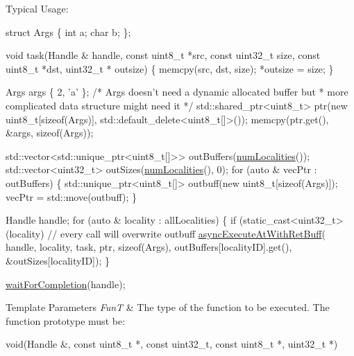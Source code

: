 Typical Usage\-: 
\begin{DoxyCode}
\textcolor{keyword}{struct }Args \{
  \textcolor{keywordtype}{int} a;
  \textcolor{keywordtype}{char} b;
\};

\textcolor{keywordtype}{void} task(Handle & handle, \textcolor{keyword}{const} uint8\_t *src, \textcolor{keyword}{const} uint32\_t size,
          \textcolor{keyword}{const} uint8\_t *dst, uint32\_t * outsize) \{
  memcpy(src, dst, size);
  *outsize = size;
\}

Args args \{ 2, \textcolor{charliteral}{'a'} \};
\textcolor{comment}{/* Args doesn't need a dynamic allocated buffer but}
\textcolor{comment}{ * more complicated data structure might need it */}
std::shared\_ptr<uint8\_t> ptr(\textcolor{keyword}{new} uint8\_t[\textcolor{keyword}{sizeof}(Args)],
                             std::default\_delete<uint8\_t[]>());
memcpy(ptr.get(), &args, \textcolor{keyword}{sizeof}(Args));

std::vector<std::unique\_ptr<uint8\_t[]>> outBuffers(\hyperlink{namespaceshad_1_1rt_a199bb50c21e9012f615520413872aef6}{numLocalities}());
std::vector<uint32\_t> outSizes(\hyperlink{namespaceshad_1_1rt_a199bb50c21e9012f615520413872aef6}{numLocalities}(), 0);
\textcolor{keywordflow}{for} (\textcolor{keyword}{auto} & vecPtr : outBuffers) \{
  std::unique\_ptr<uint8\_t[]> outbuff(\textcolor{keyword}{new} uint8\_t[\textcolor{keyword}{sizeof}(Args)]);
  vecPtr = std::move(outbuff);
\}

Handle handle;
\textcolor{keywordflow}{for} (\textcolor{keyword}{auto} & locality : allLocalities) \{
  \textcolor{keywordflow}{if} (static\_cast<uint32\_t>(locality) %
    \textcolor{comment}{// every call will overwrite outbuff}
    \hyperlink{namespaceshad_1_1rt_a7021749e6a86c90e762645385e22ac5c}{asyncExecuteAtWithRetBuff}(
      handle, locality, task, ptr, \textcolor{keyword}{sizeof}(Args),
      outBuffers[localityID].\textcolor{keyword}{get}(), &outSizes[localityID]);
\}

\hyperlink{namespaceshad_1_1rt_a6ea1d3672bac3a80032863b6732a0c0a}{waitForCompletion}(handle);
\end{DoxyCode}



\begin{DoxyTemplParams}{Template Parameters}
{\em Fun\-T} & The type of the function to be executed. The function prototype must be\-: 
\begin{DoxyCode}
void(Handle &, \textcolor{keyword}{const} uint8\_t *, \textcolor{keyword}{const} uint32\_t, \textcolor{keyword}{const} uint8\_t *, uint32\_t *)
\end{DoxyCode}
\\
\hline
\end{DoxyTemplParams}

